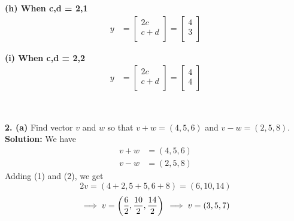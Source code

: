 \documentclass{article}
\begin{document}
\textbf{(h) When c,d = 2,1}
\begin{align*}
y &= \begin{bmatrix}
           2c \\
           c+d \\
         \end{bmatrix}= \begin{bmatrix}
           4 \\
           3 \\
         \end{bmatrix}
\end{align*}
\begin{center}
\end{center}

\textbf{(i) When c,d = 2,2}
\begin{align*}
y &= \begin{bmatrix}
           2c \\
           c+d \\
         \end{bmatrix}= \begin{bmatrix}
           4 \\
           4 \\
         \end{bmatrix}
\end{align*}
\begin{center}
\\
\end{center}

\textbf{2. (a)} Find vector $v$ and $w$ so that $v+w=(4,5,6)$ and $v-w=(2,5,8)$.
\textbf{Solution:} We have
\begin{align}
   v+w &= (4,5,6) \\
v-w &= (2,5,8)
\end{align}
Adding (1) and (2), we get
\begin{equation*}
   2v = \left(4+2, 5+5, 6+8\right) = \left(6, 10, 14\right)
\end{equation*}
\begin{equation}
\implies   v = \left(\frac{6}{2}, \frac{10}{2}, \frac{14}{2}\right)\\
\implies v = \left(3, 5, 7\right)
\end{equation}
\end{document}
